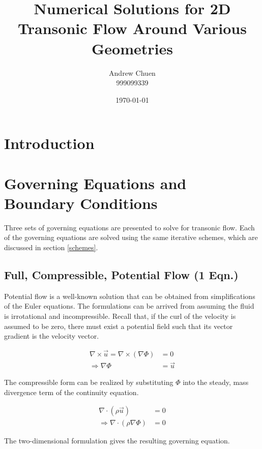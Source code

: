 \documentclass[hidelinks, 12pt]{article}
\begin{document}
	
\title{Numerical Solutions for 2D Transonic Flow Around Various Geometries}
\author{Andrew Chuen\\999099339}
\date{\today}
\maketitle

\newpage

\section{Introduction}

\section{Governing Equations and Boundary Conditions}

Three sets of governing equations are presented to solve for transonic flow. Each of the governing equations are solved using the same iterative schemes, which are discussed in section \ref{schemes}. 

\subsection{Full, Compressible, Potential Flow (1 Eqn.)}
Potential flow is a well-known solution that can be obtained from simplifications of the Euler equations. The formulations can be arrived from assuming the fluid is irrotational and incompressible. Recall that, if the curl of the velocity is assumed to be zero, there must exist a potential field such that its vector gradient is the velocity vector.

\begin{align}
\nabla \times \vec{u} = \nabla \times \left(\nabla \Phi\right) &= 0 \\
\Rightarrow \nabla \Phi &= \vec{u}
\end{align}

The compressible form can be realized by substituting $\Phi$ into the steady, mass divergence term of the continuity equation.

\begin{align}
\nabla \cdot \left(\rho \vec{u}\right) &= 0 \\
\Rightarrow \nabla \cdot \left(\rho \nabla \Phi\right) &= 0
\end{align}

The two-dimensional formulation gives the resulting governing equation.
\end{document}
